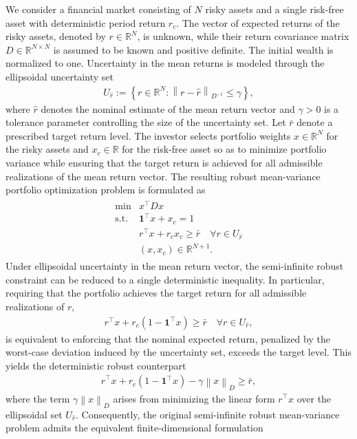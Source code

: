 \documentclass[11pt]{article}
\theoremstyle{plain}
\theoremstyle{definition}
\theoremstyle{plain}
\newcommand{\one}{{\mathbf 1}} %
\newcommand{\RR}{{\mathbb R}} %
\newcommand{\norm}[1]{\left\lVert#1\right\rVert}
\newcommand{\tpose}[1]{#1^{\top}}
\begin{document}
We consider a financial market consisting of $N$ risky assets and a single risk-free asset with deterministic period return $r_c$. The vector of expected returns of the risky assets, denoted by $r\in \RR^N$, is unknown, while their return covariance matrix $D\in\RR^{N\times N}$ is assumed to be known and positive definite. The initial wealth is normalized to one.
Uncertainty in the mean returns is modeled through the ellipsoidal uncertainty set
\begin{align*}
    U_{\hat{r}} := \left\{ r \in \RR^N : \norm{ r - \hat{r}}_{D^{-1}} \leq \gamma \right\},
\end{align*}
where $\hat{r}$ denotes the nominal estimate of the mean return vector and $\gamma>0$ is a tolerance parameter controlling the size of the uncertainty set. Let $\bar{r}$ denote a prescribed target return level.
The investor selects portfolio weights $x\in\RR^N$ for the risky assets and $x_c\in\RR$ for the risk-free asset so as to minimize portfolio variance while ensuring that the target return is achieved for all admissible realizations of the mean return vector. The resulting robust mean-variance portfolio optimization problem is formulated as
\begin{align*}
    \begin{array}{ll}
     \min  & \tpose{x} D x \\
     \text{s.t.}
& \tpose{\one} x + x_c = 1\\
& \tpose{r} x + r_c x_c \geq \bar r \quad \forall r \in U_{\hat{r}}\\
& (x,x_c) \in \RR^{N+1}.
    \end{array}
\end{align*}
Under ellipsoidal uncertainty in the mean return vector, the semi-infinite robust constraint can be reduced to a single deterministic inequality. In particular, requiring that the portfolio achieves the target return for all admissible realizations of $r$,
\begin{align*}
    \tpose{r} x + r_c(1-\tpose{\one} x) \geq \bar{r}
\quad \forall r \in U_{\hat{r}},
\end{align*}
is equivalent to enforcing that the nominal expected return, penalized by the worst-case deviation induced by the uncertainty set, exceeds the target level. This yields the deterministic robust counterpart
\begin{align*}
\tpose{\hat{r}} x + r_c(1-\tpose{\one} x) - \gamma \norm{x}_D \geq \bar{r},
\end{align*}
where the term $\gamma\norm{x}_D$ arises from minimizing the linear form $\tpose{r}x$ over the ellipsoidal set $U_{\hat{r}}$. Consequently, the original semi-infinite robust mean-variance problem admits the equivalent finite-dimensional formulation
\end{document}

